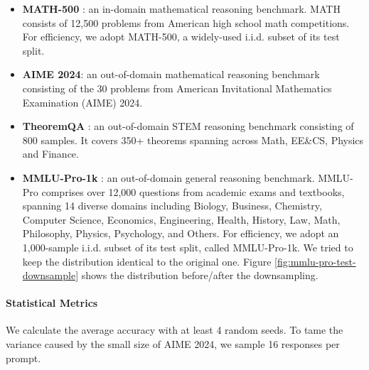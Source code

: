 \begin{itemize}
    \item \textbf{MATH-500} \citep{hendrycks2021math}: an in-domain mathematical reasoning benchmark. MATH consists of 12,500 problems from American high school math competitions. For efficiency, we adopt MATH-500, a widely-used i.i.d. subset of its test split.
    \item \textbf{AIME 2024}: an out-of-domain mathematical reasoning benchmark consisting of the 30 problems from American Invitational Mathematics Examination (AIME) 2024.
    \item \textbf{TheoremQA} \citep{chen2023theoremqa}: an out-of-domain STEM reasoning benchmark consisting of 800 samples. It covers 350+ theorems spanning across Math, EE\&CS, Physics and Finance.
    \item \textbf{MMLU-Pro-1k} \citep{wang2024mmlupro}: an out-of-domain general reasoning benchmark. MMLU-Pro comprises over 12,000 questions from academic exams and textbooks, spanning 14 diverse domains including Biology, Business, Chemistry, Computer Science, Economics, Engineering, Health, History, Law, Math, Philosophy, Physics, Psychology, and Others. For efficiency, we adopt an 1,000-sample i.i.d. subset of its test split, called MMLU-Pro-1k. We tried to keep the distribution identical to the original one. Figure \ref{fig:mmlu-pro-test-downsample} shows the distribution before/after the downsampling.
\end{itemize}

\paragraph{Statistical Metrics} We calculate the average accuracy with at least 4 random seeds. To tame the variance caused by the small size of AIME 2024, we sample 16 responses per prompt.
